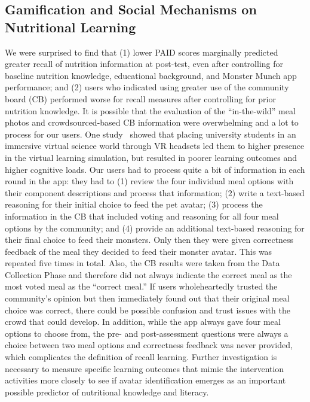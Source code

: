 \subsection{Gamification and Social Mechanisms on Nutritional Learning}
We were surprised to find that (1) lower PAID scores marginally predicted greater recall of nutrition information at post-test, even after controlling for baseline nutrition knowledge, educational background, and Monster Munch app performance; and (2) users who indicated using greater use of the community board (CB) performed worse for recall measures after controlling for prior nutrition knowledge.  
It is possible that the evaluation of the ``in-the-wild'' meal photos and crowdsourced-based CB information were overwhelming and a lot to process for our users. 
One study~\cite{makransky2019adding} showed that placing university students in an immersive virtual science world through VR headsets led them to higher presence in the virtual learning simulation, but resulted in poorer learning outcomes and higher cognitive loads. 
Our users had to process quite a bit of information in each round in the app: they had to (1) review the four individual meal options with their component descriptions
and process that information; (2) write a text-based reasoning for their initial choice to feed the pet avatar; (3) process the information in the CB that included voting and reasoning for all four meal options by the community; and (4) provide an additional text-based reasoning for their final choice to feed their monsters.
Only then they were given correctness feedback of the meal they decided to feed their monster avatar. This was repeated five times in total. Also, the CB results were taken from the Data Collection Phase and therefore did not always indicate the correct meal as the most voted meal as the ``correct meal.'' If users wholeheartedly trusted the community's opinion but then immediately found out that their original meal choice was correct, there could be possible confusion and trust issues with the crowd that could develop. 
In addition, while the app always gave four meal options to choose from, the pre- and post-assessment questions were always a choice between two meal options and correctness feedback was never provided, which complicates the definition of recall learning. 
Further investigation is necessary to measure specific learning outcomes that mimic the intervention activities more closely to see if avatar identification emerges as an important possible predictor of nutritional knowledge and literacy.

